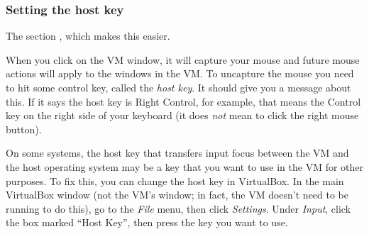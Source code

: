 \documentclass[letterpaper,10pt,english]{sphinxmanual}
\begin{document}
\subsubsection{Setting the host key}
\label{2013/vm:setting-the-host-key}



The section {\hyperref[vm:vm\string-additions]{}}, which makes this easier.



When you click on the VM window, it will capture your mouse and future mouse
actions will apply to the windows in the VM.  To uncapture the mouse you
need to hit some control key, called the \emph{host key}.  It should give you a
message about this.  If it says the host key is Right Control, for example,
that means the Control key on the right side of your keyboard (it does \emph{not}
mean to click the right mouse button).

On some systems, the host key that transfers input focus between the
VM and the host operating system may be a key that you want to use in
the VM for other purposes.  To fix this, you can
change the host key in VirtualBox.  In the main VirtualBox window (not
the VM's window; in fact, the VM doesn't need to be running to do
this), go to the \emph{File} menu, then click \emph{Settings}.  Under \emph{Input},
click the box marked ``Host Key'', then press the key you want to use.
\end{document}
